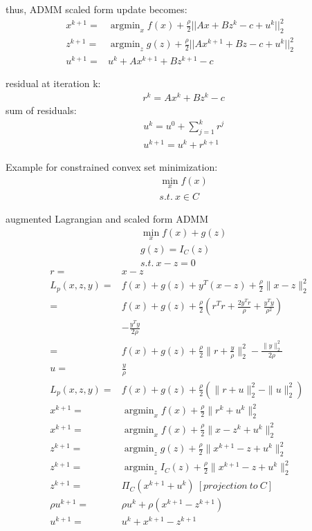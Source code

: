 \documentclass[8pt]{extarticle}
\DeclareMathOperator*{\argmin}{argmin}
\newcommand{\norm}[1]{\|#1\|}
\begin{document}
\begin{multicols*}{2}
  thus, ADMM scaled form update becomes:
  \begin{align*}
    x^{k+1} = & \argmin_{x} f(x) + \frac{\rho}{2}||Ax + Bz^k - c + u^k||_2^2\\
    z^{k+1} = & \argmin_{z} g(z) + \frac{\rho}{2}||Ax^{k+1} + Bz - c + u^k||_2^2\\
    u^{k+1} = & u^k + Ax^{k+1} +Bz^{k+1} - c
  \end{align*}

  residual at iteration k:
  \begin{align*}
    &r^k = Ax^k + Bz^k - c
  \end{align*}
  sum of residuals:
  \begin{align*}
    &u^k = u^0 + \sum_{j=1}^{k} r^j\\
    &u^{k+1} = u^k + r^{k+1}
  \end{align*}


  \vfill\null
  \columnbreak
  
  Example for constrained convex set minimization:
  \begin{align*}
    &\min_x f(x)\\
    &s.t.\ x \in C
  \end{align*}

  augmented Lagrangian and scaled form ADMM
  \begin{align*}
    &\min_x f(x) + g(z)\\
    &g(z) = I_C(z)\\
    &s.t.\ x-z=0
  \end{align*}
  \begin{align*}
    r=&x-z\\
    L_p(x,z,y) =& f(x) + g(z) + y^T(x-z) + \frac{\rho}{2} \norm{x-z}_2^2\\
               =& f(x) + g(z) + \frac{\rho}{2}(r^T r + \frac{2 y^T r}{\rho} + \frac{y^T y}{\rho^2})\\
                & - \frac{y^T y}{2 \rho}\\
    =& f(x) + g(z) + \frac{\rho}{2} \norm{r+\frac{y}{\rho}}_2^2 - \frac{\norm{y}_2^2}{2\rho}\\
    u=& \frac{y}{\rho}\\
    L_p(x,z,y) =& f(x) + g(z) + \frac{\rho}{2}(\norm{r+u}_2^2 - \norm{u}_2^2)\\
    x^{k+1} =& \argmin_x f(x) + \frac{\rho}{2} \norm{r^k+u^k}_2^2\\
    x^{k+1} =& \argmin_x f(x) + \frac{\rho}{2} \norm{x-z^k+u^k}_2^2\\
    z^{k+1} =& \argmin_z g(z) + \frac{\rho}{2} \norm{x^{k+1}-z+u^k}_2^2\\
    z^{k+1} =& \argmin_z I_C(z) + \frac{\rho}{2} \norm{x^{k+1}-z+u^k}_2^2\\
    z^{k+1} =& \Pi_C(x^{k+1}+u^k)\ [projection\ to\ C]\\
    \rho u^{k+1} =& \rho u^k + \rho (x^{k+1} - z^{k+1})\\
    u^{k+1} =& u^k + x^{k+1} - z^{k+1}
  \end{align*}


\end{multicols*}
\end{document}
